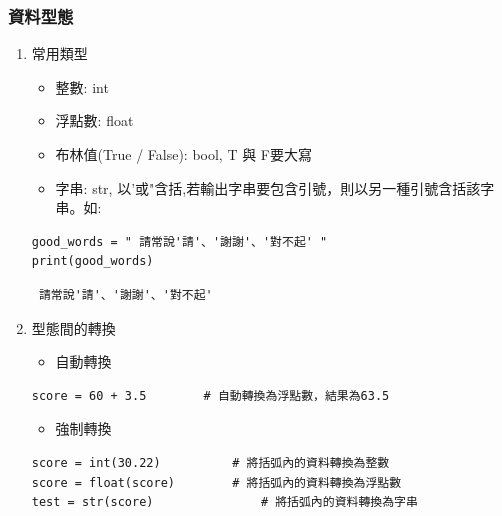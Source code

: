 \documentclass[a4paper,12pt]{article}
\begin{document}
\subsubsection{資料型態}
\label{sec:org5ae6e7e}
\begin{enumerate}
\item 常用類型
\label{sec:org06799f4}
\begin{itemize}
\item 整數: int\\
\item 浮點數: float\\
\item 布林值(True / False): bool, T 與 F要大寫\\
\item 字串: str, 以'或"含括,若輸出字串要包含引號，則以另一種引號含括該字串。如:\\
\end{itemize}
\lstset{breaklines=true,language=Python,label= ,caption= ,captionpos=b,firstnumber=1,numbers=left}
\begin{lstlisting}
good_words = " 請常說'請'、'謝謝'、'對不起' "
print(good_words)
\end{lstlisting}

\begin{verbatim}
 請常說'請'、'謝謝'、'對不起' 
\end{verbatim}

\item 型態間的轉換
\label{sec:org9a7d4eb}

\begin{itemize}
\item 自動轉換\\
\end{itemize}
\lstset{breaklines=true,language=Python,label= ,caption= ,captionpos=b,numbers=none}
\begin{lstlisting}
score = 60 + 3.5		# 自動轉換為浮點數，結果為63.5	
\end{lstlisting}

\begin{itemize}
\item 強制轉換\\
\end{itemize}
\lstset{breaklines=true,language=Python,label= ,caption= ,captionpos=b,numbers=none}
\begin{lstlisting}
score = int(30.22)			# 將括弧內的資料轉換為整數
score = float(score)		# 將括弧內的資料轉換為浮點數
test = str(score)				# 將括弧內的資料轉換為字串
\end{lstlisting}
\end{enumerate}
\end{document}
